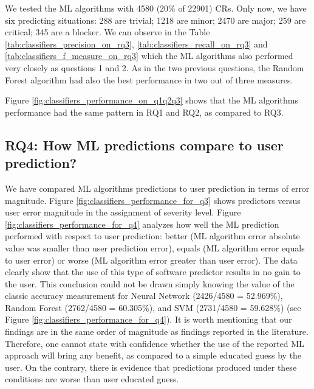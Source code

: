 We tested the ML algorithms with 4580 (20\% of 22901) CRs. Only now, we have six predicting situations: 288 are trivial; 1218 are minor; 2470 are major; 259 are critical; 345 are a blocker. We can observe in the Table \ref{tab:classifiers_precision_on_rq3}, \ref{tab:classifiers_recall_on_rq3} and \ref{tab:classifiers_f_measure_on_rq3} which the ML algorithms also performed very closely as questions 1 and 2. As in the two previous questions, the Random Forest algorithm had also the best performance in two out of three measures.

Figure \ref{fig:classifiers_performance_on_q1q2q3} shows that the ML algorithms performance had the same pattern in RQ1 and RQ2, as compared to RQ3.

\subsection{RQ4: How ML predictions compare to user prediction?}\label{subsec:rq4}
We have compared ML algorithms predictions to user prediction in terms of error magnitude. Figure \ref{fig:classifiers_performance_for_q3} shows predictors versus user error magnitude in the assignment of severity level.  Figure \ref{fig:classifiers_performance_for_q4} analyzes how well the ML prediction performed with respect to user prediction: better (ML algorithm error absolute value was smaller than user prediction error), equals (ML algorithm error equals to user error) or worse (ML algorithm error greater than user error).  The data clearly show that the use of this type of software predictor results in no gain to the user. This conclusion could not be drawn simply knowing the value of the classic accuracy measurement for Neural Network (2426/4580 = 52.969\%), Random Forest (2762/4580 = 60.305\%), and SVM (2731/4580 = 59.628\%) (see Figure \ref{fig:classifiers_performance_for_q4}). It is worth mentioning that our findings are in the same order of magnitude as findings reported in the literature. Therefore, one cannot state with confidence whether the use of the reported ML approach will bring any  benefit, as compared to a simple educated guess by the user. On the contrary, there is evidence that predictions produced under these conditions are worse than user educated guess.

